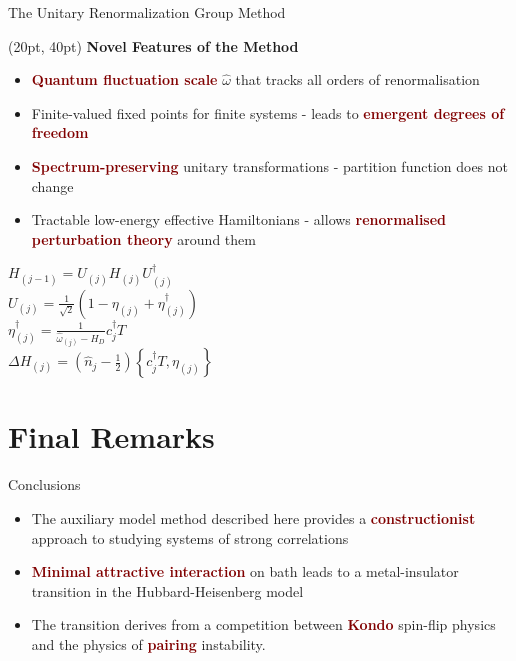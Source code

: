 \documentclass[aspectratio=169]{beamer}
\newcommand{\head}[1]{
\begin{textblock*}{\textwidth}(20pt, 40pt)
\textbf{\Large {#1}}
\end{textblock*}
}
\newcommand{\focus}[1]{\textcolor{maroon}{\textbf{#1}}}
\begin{document}
\begin{frame}[noframenumbering]{The Unitary Renormalization Group Method}
\head{Novel Features of the Method}
\begin{minipage}{0.65\textwidth}
\begin{itemize}[<+->]
	\item \focus{Quantum fluctuation scale} \(\hat \omega\)	that tracks all orders of renormalisation\\[10pt]
	\item Finite-valued fixed points for finite systems - leads to \focus{emergent degrees of freedom}\\[10pt]
	\item \focus{Spectrum-preserving} unitary transformations - partition function does not change\\[10pt]
	\item Tractable low-energy effective Hamiltonians - allows \focus{renormalised perturbation theory} around them 
\end{itemize}
\end{minipage}
\hspace*{\fill}
\begin{minipage}{0.3\textwidth}
\begin{flushleft}
	\(H_{(j-1)} = U_{(j)} H_{(j)} U_{(j)}^\dagger\)\\[15pt]
	\(U_{(j)} = \frac{1}{\sqrt 2}\left(1 - \eta_{(j)} + \eta_{(j)}^\dagger\right) \)\\[15pt]
	\( \eta^\dagger_{(j)} = \frac{1}{\hat \omega_{(j)} - H_D}c^\dagger_j T\)\\[15pt]
	\( \Delta H_{(j)} = \left(\hat n_j - \frac{1}{2}\right) \left\{c^\dagger_j T, \eta_{(j)}\right\} \)
\end{flushleft}
\end{minipage}
\end{frame}

\section{Final Remarks}
\label{concl}

\begin{frame}[noframenumbering]{Conclusions}
	\begin{itemize}[<+->]
		\item The auxiliary model method described here provides a \focus{constructionist} approach to studying systems of strong correlations
		\item \focus{Minimal attractive interaction} on bath leads to a metal-insulator transition in the Hubbard-Heisenberg model
		\item The transition derives from a competition between \focus{Kondo} spin-flip physics and the physics of \focus{pairing} instability.
\end{itemize}
\end{frame}
\end{document}
